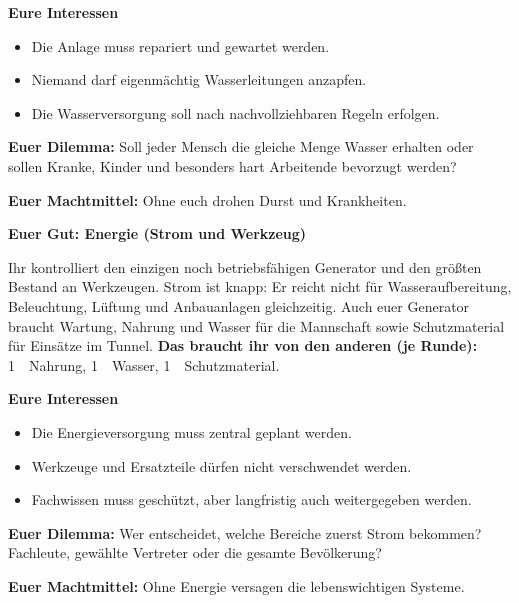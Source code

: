 \medskip\noindent\textbf{Eure Interessen}
\begin{itemize}
  \item Die Anlage muss repariert und gewartet werden.
  \item Niemand darf eigenmächtig Wasserleitungen anzapfen.
  \item Die Wasserversorgung soll nach nachvollziehbaren Regeln erfolgen.
\end{itemize}
\textbf{Euer Dilemma:} Soll jeder Mensch die gleiche Menge Wasser erhalten oder sollen Kranke, Kinder und besonders hart Arbeitende bevorzugt werden?\par
\textbf{Euer Machtmittel:} Ohne euch drohen Durst und Krankheiten.\par\medskip
{}

\clearpage
{}
\noindent\textbf{Euer Gut: Energie (Strom und Werkzeug)} \rE\par\vspace{1mm}
Ihr kontrolliert den einzigen noch betriebsfähigen Generator und den größten Bestand an Werkzeugen. Strom ist knapp: Er reicht nicht für Wasseraufbereitung, Beleuchtung, Lüftung und Anbauanlagen gleichzeitig. Auch euer Generator braucht Wartung, Nahrung und Wasser für die Mannschaft sowie Schutzmaterial für Einsätze im Tunnel.
\textbf{Das braucht ihr von den anderen (je Runde):} 1~\rN\ Nahrung, 1~\rW\ Wasser, 1~\rS\ Schutzmaterial.

\medskip\noindent\textbf{Eure Interessen}
\begin{itemize}
  \item Die Energieversorgung muss zentral geplant werden.
  \item Werkzeuge und Ersatzteile dürfen nicht verschwendet werden.
  \item Fachwissen muss geschützt, aber langfristig auch weitergegeben werden.
\end{itemize}
\textbf{Euer Dilemma:} Wer entscheidet, welche Bereiche zuerst Strom bekommen? Fachleute, gewählte Vertreter oder die gesamte Bevölkerung?\par
\textbf{Euer Machtmittel:} Ohne Energie versagen die lebenswichtigen Systeme.\par\medskip
{}

